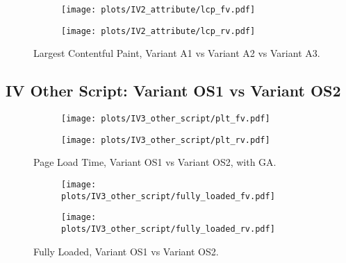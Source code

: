 \begin{figure}
	\centering
	\begin{subfigure}{.5\textwidth}
		\centering
		\texttt{[image: plots/IV2\_attribute/lcp\_fv.pdf]}
		\label{fig:sub1}
	\end{subfigure}%
	\begin{subfigure}{.5\textwidth}
		\centering
		\texttt{[image: plots/IV2\_attribute/lcp\_rv.pdf]}
		\label{fig:sub2}
	\end{subfigure}
	\caption{Largest Contentful Paint, Variant A1 vs Variant A2 vs Variant A3.}
	\label{figure:plt_original_test}
\end{figure}







\subsection{IV Other Script: Variant OS1 vs Variant OS2}





\begin{figure}
	\centering
	\begin{subfigure}{.5\textwidth}
		\centering
		\texttt{[image: plots/IV3\_other\_script/plt\_fv.pdf]}
		\label{fig:sub1}
	\end{subfigure}%
	\begin{subfigure}{.5\textwidth}
		\centering
		\texttt{[image: plots/IV3\_other\_script/plt\_rv.pdf]}
		\label{fig:sub2}
	\end{subfigure}
	\caption{Page Load Time, Variant OS1 vs Variant OS2, with GA.}
	\label{figure:plt_original_test}
\end{figure}


\begin{figure}
	\centering
	\begin{subfigure}{.5\textwidth}
		\centering
		\texttt{[image: plots/IV3\_other\_script/fully\_loaded\_fv.pdf]}
		\label{fig:sub1}
	\end{subfigure}%
	\begin{subfigure}{.5\textwidth}
		\centering
		\texttt{[image: plots/IV3\_other\_script/fully\_loaded\_rv.pdf]}
		\label{fig:sub2}
	\end{subfigure}
	\caption{Fully Loaded, Variant OS1 vs Variant OS2.}
	\label{figure:plt_original_test}
\end{figure}

